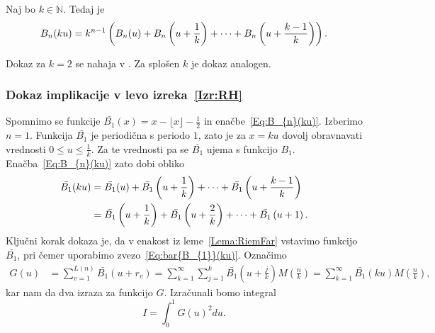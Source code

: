 \documentclass[mat1]{fmfdelo}
\begin{document}
\begin{trditev}
Naj bo $k \in \mathbb{N}$. Tedaj je
\begin{equation}
\label{Eq:B_{n}(ku)}
B_{n}(ku) = k^{n-1} \left ( B_{n}(u) + B_{n} \left( u + \frac{1}{k} \right) + \cdots + B_{n} \left( u + \frac{k-1}{k} \right) \right).
\end{equation}
\end{trditev}

\begin{dokaz}
Dokaz za $k=2$ se nahaja v \cite[poglavje 6.2, str.~102--103]{zetafunction}. Za splošen $k$ je dokaz analogen.
\end{dokaz}

\subsubsection{Dokaz implikacije v levo izreka~\ref{Izr:RH}}

Spomnimo se funkcije $ \bar{B_{1}}(x) = x - \lfloor x \rfloor - \frac{1}{2} $ in enačbe~\eqref{Eq:B_{n}(ku)}. Izberimo $n=1$. Funkcija $\bar{B_{1}}$ je periodična s periodo $1$, zato je za $x=ku$ dovolj obravnavati vrednosti $0 \leq u \leq \frac{1}{k}$. Za te vrednosti pa se $\bar{B_{1}}$ ujema s funkcijo $B_{1}$. Enačba~\eqref{Eq:B_{n}(ku)} zato dobi obliko
\begin{align}
\label{Eq:bar{B_{1}}(ku)}
\bar{B_{1}}(ku) &= \bar{B_{1}}(u) + \bar{B_{1}} \left( u + \frac{1}{k} \right) + \cdots + \bar{B_{1}} \left( u + \frac{k-1}{k} \right) \nonumber \\
			&= \bar{B_{1}} \left( u + \frac{1}{k} \right) + \bar{B_{1}} \left( u + \frac{2}{k} \right) + \cdots + \bar{B_{1}} \left( u + 1 \right).
\end{align}
%
Ključni korak dokaza je, da v enakost iz leme~\ref{Lema:RiemFar} vstavimo funkcijo $ \bar{B_{1}}$, pri čemer uporabimo zvezo~\eqref{Eq:bar{B_{1}}(ku)}. Označimo
\begin{align}
G(u) &= \sum_{v=1}^{L(n)} \bar{B_{1}}(u+r_v) = \sum_{k=1}^{\infty} \sum_{j=1}^{k} \bar{B_{1}} \left(u + \frac{j}{k} \right) M \left(\frac{n}{k} \right)
	= \sum_{k=1}^{\infty} \bar{B_{1}}(ku) M \left(\frac{n}{k} \right),
\end{align}
kar nam da dva izraza za funkcijo $G$. Izračunali bomo integral 
\begin{equation}
I = \int_{0}^1 G(u)^2 du.
\end{equation}
\end{document}
